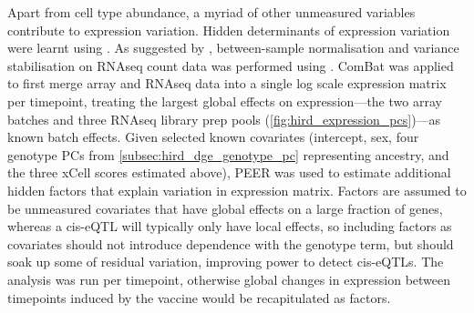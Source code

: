 %
%
Apart from cell type abundance, a myriad of other unmeasured variables contribute to expression variation.
Hidden determinants of expression variation were learnt using \autocite{stegle2012UsingProbabilisticEstimation}.
As suggested by \autocite{stegle2012UsingProbabilisticEstimation}, between-sample normalisation and variance stabilisation on \gls{RNAseq} count data was performed using .
ComBat was applied to first merge array and \gls{RNAseq} data into a single log scale expression matrix per timepoint, treating the largest global effects on expression---the two array batches and three \gls{RNAseq} library prep pools (\autoref{fig:hird_expression_pcs})---as known batch effects.
Given selected known covariates (intercept, sex, four genotype \glspl{PC} from \autoref{subsec:hird_dge_genotype_pc} representing ancestry, and the three xCell scores estimated above),
PEER was used to estimate additional hidden factors that explain variation in expression matrix.
Factors are assumed to be unmeasured covariates that have global effects on a large fraction of genes, 
whereas a cis-\gls{eQTL} will typically only have local effects, so including factors as covariates should not introduce dependence with the genotype term,
but should soak up some of residual variation, improving power to detect cis-\glspl{eQTL}.
The analysis was run per timepoint, otherwise global changes in expression between timepoints induced by the vaccine would be recapitulated as factors.

